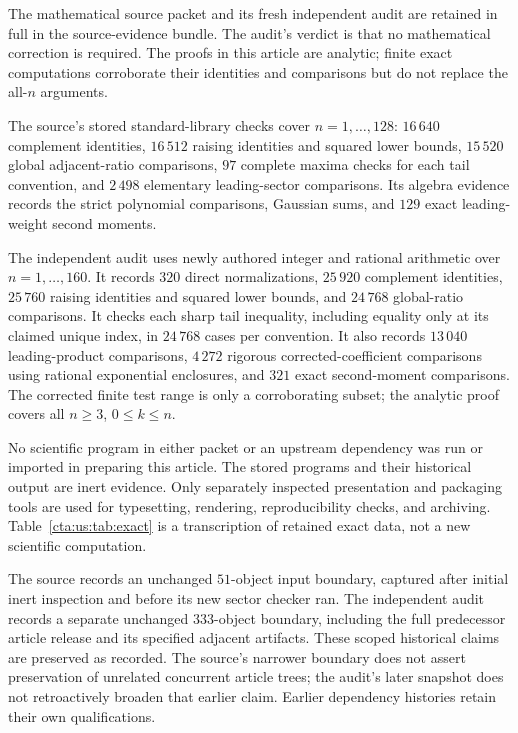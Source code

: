 \documentclass[11pt]{article}
\theoremstyle{definition}
\theoremstyle{remark}
\begin{document}
The mathematical source packet \cite{us-source} and its fresh independent
audit \cite{us-audit} are retained in full in the source-evidence bundle.
The audit's verdict is that no mathematical correction is required.
The proofs in this article are analytic; finite exact computations
corroborate their identities and comparisons but do not replace
the all-$n$ arguments.

The source's stored standard-library checks cover $n=1,\ldots,128$:
$16\,640$ complement identities, $16\,512$ raising identities and
squared lower bounds, $15\,520$ global adjacent-ratio comparisons,
$97$ complete maxima checks for each tail convention, and $2\,498$
elementary leading-sector comparisons. Its algebra evidence records
the strict polynomial comparisons, Gaussian sums, and $129$ exact
leading-weight second moments.

The independent audit uses newly authored integer and rational
arithmetic over $n=1,\ldots,160$. It records $320$ direct
normalizations, $25\,920$ complement identities, $25\,760$ raising
identities and squared lower bounds, and $24\,768$ global-ratio
comparisons. It checks each sharp tail inequality, including equality
only at its claimed unique index, in $24\,768$ cases per convention.
It also records $13\,040$ leading-product comparisons, $4\,272$
rigorous corrected-coefficient comparisons using rational exponential
enclosures, and $321$ exact second-moment comparisons. The corrected
finite test range is only a corroborating subset; the analytic proof
covers all $n\ge3$, $0\le k\le n$.

No scientific program in either packet or an upstream dependency was
run or imported in preparing this article. The stored programs and
their historical output are inert evidence. Only separately inspected
presentation and packaging tools are used for typesetting, rendering,
reproducibility checks, and archiving. Table~\ref{cta:us:tab:exact} is a
transcription of retained exact data, not a new scientific computation.

The source records an unchanged $51$-object input boundary, captured
after initial inert inspection and before its new sector checker ran.
The independent audit records a separate unchanged $333$-object
boundary, including the full predecessor article release and its
specified adjacent artifacts. These scoped historical claims are
preserved as recorded. The source's narrower boundary does not assert
preservation of unrelated concurrent article trees; the audit's later
snapshot does not retroactively broaden that earlier claim. Earlier
dependency histories retain their own qualifications.
\end{document}
